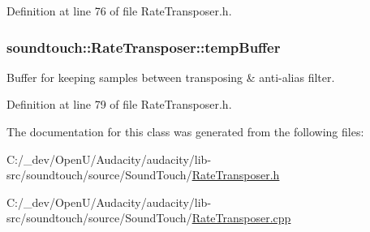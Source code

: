 Definition at line 76 of file Rate\+Transposer.\+h.

\subsubsection[{\texorpdfstring{temp\+Buffer}{tempBuffer}}]{ soundtouch\+::\+Rate\+Transposer\+::temp\+Buffer\hspace{0.3cm}{\ttfamily [protected]}}\hypertarget{classsoundtouch_1_1_rate_transposer_a898c0c2166828bea24da8a873ecd35e0}{}\label{classsoundtouch_1_1_rate_transposer_a898c0c2166828bea24da8a873ecd35e0}


Buffer for keeping samples between transposing \& anti-\/alias filter. 



Definition at line 79 of file Rate\+Transposer.\+h.



The documentation for this class was generated from the following files\+:\begin{DoxyCompactItemize}
\item 
C\+:/\+\_\+dev/\+Open\+U/\+Audacity/audacity/lib-\/src/soundtouch/source/\+Sound\+Touch/\hyperlink{_rate_transposer_8h}{Rate\+Transposer.\+h}\item 
C\+:/\+\_\+dev/\+Open\+U/\+Audacity/audacity/lib-\/src/soundtouch/source/\+Sound\+Touch/\hyperlink{_rate_transposer_8cpp}{Rate\+Transposer.\+cpp}\end{DoxyCompactItemize}
